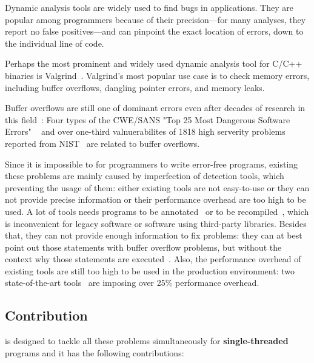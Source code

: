 
Dynamic analysis tools are widely used to find bugs in
applications. They are popular among programmers because of their
precision---for many analyses, they report no false positives---and
can pinpoint the exact location of errors, down to the individual line
of code.

Perhaps the most prominent and widely used dynamic analysis tool for
C/C++ binaries is Valgrind~\cite{}. Valgrind's most popular use case
is to check memory errors, including buffer overflows, dangling
pointer errors, and memory leaks.








Buffer overflows are still one of dominant errors 
even after decades of research in this field~\cite{}: 
Four types of the CWE/SANS "Top 25 Most Dangerous Software Errors" 
~\cite{overflows1} and 
over one-third valnuerabilites of 1818 high serverity problems
reported from NIST~\cite{overflows2} are related to buffer overflows.

Since it is impossible to for programmers to write error-free programs, 
existing these problems are mainly caused by imperfection
of detection tools, which preventing the usage of them: 
either existing tools are not easy-to-use or they can not provide precise information 
or their performance
overhead are too high to be used.
A lot of tools needs programs to be annotated~\cite{} or to be recompiled~\cite{}, 
which is inconvenient for legacy software or software using third-party libraries.
Besides that, they can not provide enough information to fix problems: they can
at best point out those statements with buffer overflow problems, but without the context
why those statements are executed~\cite{}. 
Also, the performance overhead of existing tools are still too high to be
used in the production environment: two state-of-the-art tools~\cite{} are imposing over 25\%
performance overhead. 

\subsection{Contribution}
\doubletake{} is designed to tackle all these problems simultaneously for \textbf{single-threaded}
programs and it has the following contributions:

